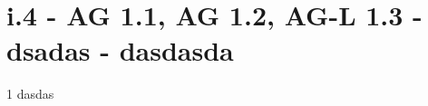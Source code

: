\section{i.4 - AG 1.1, AG 1.2, AG-L 1.3 - dsadas - dasdasda}

\begin{langesbeispiel}\item[1] %
dasdas

\end{langesbeispiel}